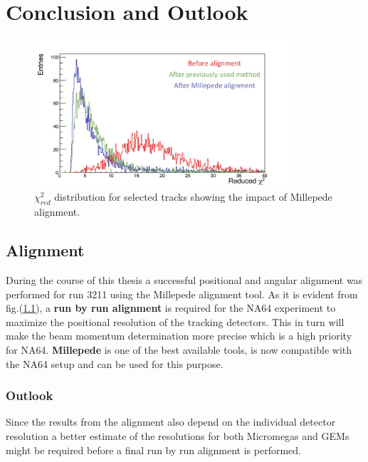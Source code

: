 
\chapter{Conclusion and Outlook}
\label{sec:conc}
\begin{figure}[h!]
\centering
\includegraphics[width=0.85\textwidth]{thesis_figures/chi2_comp_conclusion_2.png}
\caption{$\chi^2_{red}$ distribution for selected tracks showing the impact of Millepede alignment.}
\label{fig:red_chi2_4}
\end{figure}

\section*{Alignment}
During the course of this thesis a successful positional and angular alignment was performed for run 3211 using the Millepede alignment tool. As it is evident from fig.(\ref{fig:red_chi2_4}), a \textbf{run by run alignment} is required for the NA64 experiment to maximize the positional resolution of the tracking detectors. This in turn will make the beam momentum determination more precise which is a high priority for NA64. \textbf{Millepede} is one of the best available tools, is now compatible with the NA64 setup and can be used for this purpose.

\subsection*{Outlook}
Since the results from the alignment also depend on the individual detector resolution a better estimate of the resolutions for both Micromegas and GEMs might be required before a final run by run alignment is performed.

